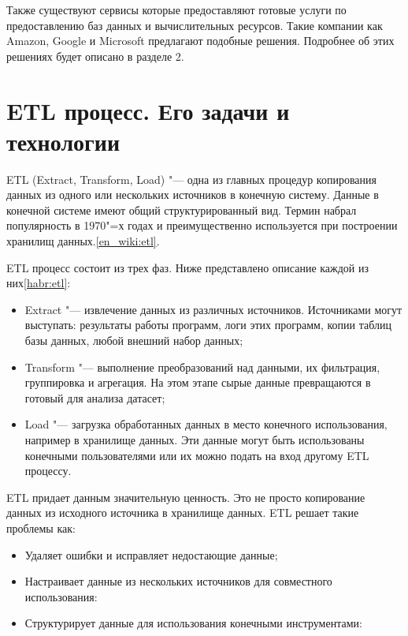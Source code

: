 \documentclass[bachelor, och, pract]{SCWorks}
\begin{document}
Также существуют сервисы которые предоставляют готовые услуги по предоставлению баз данных и вычислительных ресурсов. Такие компании как  Amazon, Google и Microsoft предлагают подобные решения. Подробнее об этих решениях будет описано в разделе 2.


\newpage

\section{ETL процесс. Его задачи и технологии}
ETL (Extract, Transform, Load) "--- одна из главных процедур копирования данных из одного или нескольких источников в конечную систему. Данные в конечной системе имеют общий структурированный вид. Термин набрал популярность в  1970"=х годах и преимущественно используется при построении хранилищ данных.\ref{en_wiki:etl}.

ETL процесс состоит из трех фаз. Ниже представлено описание каждой из них\ref{habr:etl}:
\begin{itemize}
	\item Extract "--- извлечение данных из различных источников. Источниками могут выступать: результаты работы программ, логи этих программ, копии таблиц базы данных, любой внешний набор данных;
	\item Transform "--- выполнение преобразований над данными, их фильтрация, группировка и агрегация. На этом этапе сырые данные превращаются в готовый для анализа датасет;
	\item Load "--- загрузка обработанных данных в место конечного использования, например в хранилище данных. Эти данные могут быть использованы конечными пользователями или их можно подать на вход другому ETL процессу.
\end{itemize}

ETL придает данным значительную ценность. Это не просто копирование данных из исходного источника в хранилище данных.
ETL решает такие проблемы как:
\begin{itemize}
	\item Удаляет ошибки  и исправляет недостающие данные;
	\item Настраивает данные из нескольких источников для совместного использования:
	\item Структурирует данные для использования конечными инструментами:
\end{itemize}
\end{document}

